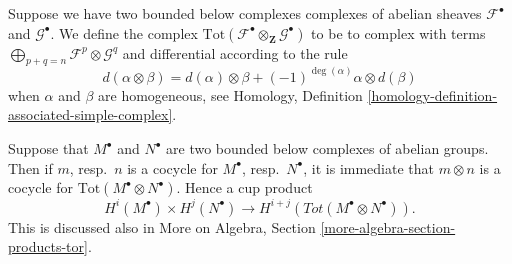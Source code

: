 \medskip\noindent
Suppose we have two bounded below complexes complexes of abelian sheaves
${\mathcal F}^\bullet$ and ${\mathcal G}^\bullet$. We define the complex
$\text{Tot}({\mathcal F}^\bullet\otimes_{\mathbf Z} {\mathcal G}^\bullet)$
to be to complex with terms
$\bigoplus_{p + q = n} {\mathcal F}^p \otimes {\mathcal G}^q$
and differential according to the rule
\begin{equation}
\label{equation-differential-tensor-product-complexes}
d(\alpha \otimes \beta) =
d(\alpha)\otimes \beta + (-1)^{\deg(\alpha)} \alpha \otimes d(\beta)
\end{equation}
when $\alpha$ and $\beta$ are homogeneous, see
Homology, Definition \ref{homology-definition-associated-simple-complex}.

\medskip\noindent
Suppose that $M^\bullet$ and $N^\bullet$ are two bounded below
complexes of abelian groups. Then if $m$, resp.\ $n$
is a cocycle for $M^\bullet$, resp.\ $N^\bullet$, it is immediate
that $m \otimes n$ is a cocycle for $\text{Tot}(M^\bullet\otimes N^\bullet)$.
Hence a cup product
$$
H^i(M^\bullet) \times H^j(N^\bullet)
\longrightarrow
H^{i + j}(Tot(M^\bullet\otimes N^\bullet)).
$$
This is discussed also in
More on Algebra, Section \ref{more-algebra-section-products-tor}.

